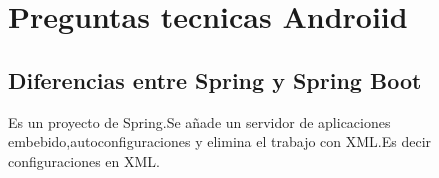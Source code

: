\chapter{Preguntas tecnicas Androiid}
\section{Diferencias entre Spring y Spring Boot}
Es un proyecto de Spring.Se añade un servidor de aplicaciones embebido,autoconfiguraciones
y elimina el trabajo con XML.Es decir configuraciones en XML.
